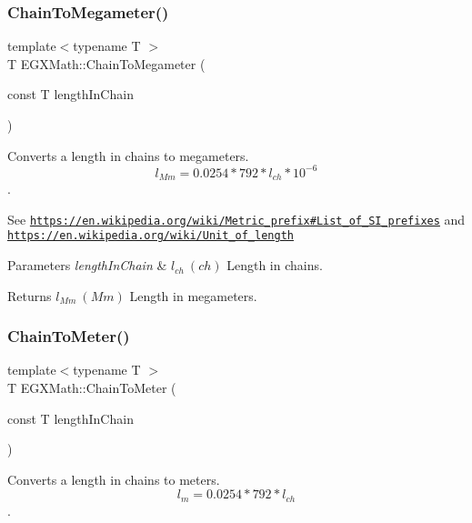 \subsubsection{\texorpdfstring{Chain\+To\+Megameter()}{ChainToMegameter()}}
{\footnotesize\ttfamily template$<$typename T $>$ \\
T E\+G\+X\+Math\+::\+Chain\+To\+Megameter (\begin{DoxyParamCaption}\item[{const T}]{length\+In\+Chain }\end{DoxyParamCaption})}



Converts a length in chains to megameters. \[ l_{Mm}=0.0254 * 792 * l_{ch} * 10^{-6} \]. 

See \href{https://en.wikipedia.org/wiki/Metric_prefix#List_of_SI_prefixes}{\tt https\+://en.\+wikipedia.\+org/wiki/\+Metric\+\_\+prefix\#\+List\+\_\+of\+\_\+\+S\+I\+\_\+prefixes} and \href{https://en.wikipedia.org/wiki/Unit_of_length}{\tt https\+://en.\+wikipedia.\+org/wiki/\+Unit\+\_\+of\+\_\+length} 
\begin{DoxyParams}{Parameters}
{\em length\+In\+Chain} & $ l_{ch}\ (ch)$ Length in chains. \\
\hline
\end{DoxyParams}
\begin{DoxyReturn}{Returns}
$ l_{Mm}\ (Mm)$ Length in megameters. 
\end{DoxyReturn}
\mbox{\label{group___e_g_x_math-_conversions-_length_conversions-_imperial-_chain-_s_i_ga94f1a1b0e10796717226224d825e0490}} 
\subsubsection{\texorpdfstring{Chain\+To\+Meter()}{ChainToMeter()}}
{\footnotesize\ttfamily template$<$typename T $>$ \\
T E\+G\+X\+Math\+::\+Chain\+To\+Meter (\begin{DoxyParamCaption}\item[{const T}]{length\+In\+Chain }\end{DoxyParamCaption})}



Converts a length in chains to meters. \[ l_{m}=0.0254 * 792 * l_{ch} \]. 


